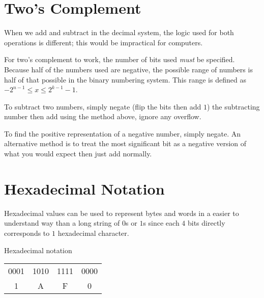 \section{Two's Complement}\label{sec:two_s_complement}

When we add and subtract in the decimal system, the logic used for both operations is different; this would be impractical for computers.

For two's complement to work, the number of bits used \emph{must} be specified.
Because half of the numbers used are negative, the possible range of numbers is half of that possible in the binary numbering system.
This range is defined as \(-2^{n-1} \le x \le 2^{k-1} - 1\).

To subtract two numbers, simply negate (flip the bits then add \(1\)) the subtracting number then add using the method above, ignore any overflow.

To find the positive representation of a negative number, simply negate.
An alternative method is to treat the most significant bit as a negative version of what you would expect then just add normally.

\section{Hexadecimal Notation}\label{sec:hexadecimal_notation}

Hexadecimal values can be used to represent bytes and words in a easier to understand way than a long string of \(0\)s or \(1\)s since each \(4\) bits directly corresponds to \(1\) hexadecimal character.

\begin{highlight}{Hexadecimal notation}
    \begin{tabular}{c|c|c|c}
        0001 & 1010 & 1111 & 0000 \\
        1    & A    & F    & 0
    \end{tabular}
\end{highlight}
